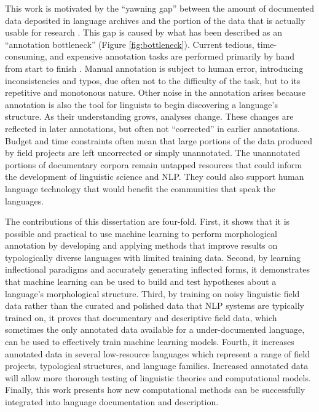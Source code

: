 This work is motivated by the “yawning gap” between the amount of documented data deposited in language archives and the portion of the data that is actually usable for research \citep{seifart_language_2018}. This gap is caused by what has been described as an ``annotation bottleneck'' (Figure \ref{fig:bottleneck}). Current tedious, time-consuming, and expensive annotation tasks are performed primarily by hand from start to finish \citep{simons_worlds_2013,holton_developing_2017}. Manual annotation is subject to human error, introducing inconsistencies and typos, due often not to the difficulty of the task, but to its repetitive and monotonous nature. Other noise in the annotation arises because annotation is also the tool for linguists to begin discovering a language's structure. As their understanding grows, analyses change. These changes are reflected in later annotations, but often not ``corrected'' in earlier annotations.
Budget and time constraints often mean that large portions of the data produced by field projects are left uncorrected or simply unannotated. The unannotated portions of documentary corpora remain untapped resources that could inform the development of linguistic science and NLP. They could also support human language technology that would benefit the communities that speak the languages. 

The contributions of this dissertation are four-fold. First, it shows that it is possible and practical to use machine learning to perform morphological annotation by developing and applying methods that improve results on typologically diverse languages with limited training data. Second, by learning inflectional paradigms and accurately generating inflected forms, it demonstrates that machine learning can be used to build and test hypotheses about a language's morphological structure. Third, by training on noisy linguistic field data rather than the curated and polished data that NLP systems are typically trained on, it proves that documentary and descriptive field data, which sometimes the only annotated data available for a under-documented language, can be used to effectively train machine learning models. 
Fourth, it increases annotated data in several low-resource languages which represent a range of field projects, typological structures, and language families. Increased annotated data will allow more thorough testing of linguistic theories and computational models.
Finally, this work presents how new computational methods can be successfully integrated into language documentation and description. 

